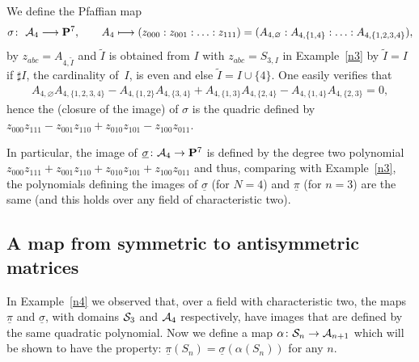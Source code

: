 \documentclass[pdftex]{sigma}
\newcommand{\PP}{{\bf P}}
\newcommand{\cA}{{\cal A}}
\newcommand{\cS}{{\cal S}}
\newcommand{\tI}{{\tilde{I}}}
\numberwithin{equation}{section}
\begin{document}
\begin{Example}[the case $N=4$]\label{n4}
We define the Pfaffian map
\begin{gather*}
\sigma\colon \ \cA_4 \longrightarrow \PP^7,\qquad A_4 \longmapsto (z_{000}:z_{001}:\ldots:z_{111})= (A_{4,\varnothing}:A_{4,\{1,4\}}:\ldots:A_{4,\{1,2,3,4\}}),
\end{gather*}
by $z_{abc}=A_{4,\tilde{I}}$ and $\tI$ is obtained from $I$ with $z_{abc}=S_{3,I}$ in Example~\ref{n3} by $\tI=I$ if $\sharp I$, the cardinality of~$I$, is even and else $\tI=I\cup\{4\}$. One easily verifies that
\begin{gather*}
A_{4,\varnothing}A_{4,\{1,2,3,4\}} - A_{4,\{1,2\}}A_{4,\{3,4\}}+ A_{4,\{1,3\}}A_{4,\{2,4\}}-A_{4,\{1,4\}}A_{4,\{2,3\}} = 0,
\end{gather*}
hence the (closure of the image) of $\sigma$ is the quadric defined by $z_{000}z_{111}-z_{001}z_{110}+z_{010}z_{101}-z_{100}z_{011}$.

In particular, the image of $\underline{\sigma}\colon \cA_4\rightarrow\PP^{7}$ is defined by the degree two polynomial $z_{000}z_{111}+z_{001}z_{110}+z_{010}z_{101}+z_{100}z_{011}$ and thus, comparing with Example~\ref{n3}, the polynomials defining the images of $\underline{\sigma}$ (for $N=4$) and $\underline{\pi}$ (for $n=3$) are the same (and this holds over any field of characteristic two).
\end{Example}

\subsection{A map from symmetric to antisymmetric matrices}\label{mapsa}
In Example~\ref{n4} we observed that, over a field with characteristic two, the maps $\underline{\pi}$ and $\underline{\sigma}$, with domains $\cS_3$ and $\cA_4$ respectively, have images that are defined by the same quadratic polynomial. Now we define a map $\alpha\colon \cS_n\rightarrow\cA_{n+1}$ which will be shown
to have the property:
$\underline{\pi}(S_n)=\underline{\sigma}(\alpha(S_n))$ for any $n$.
\end{document}
